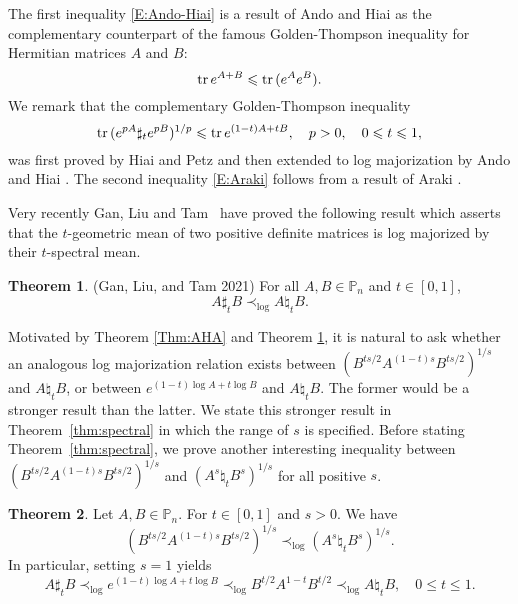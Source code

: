 \documentclass[12pt, reqno]{amsart}
\numberwithin{equation}{section}
\theoremstyle{definition}
\newtheorem{theorem}{Theorem}[section]
\renewcommand{\le}{\leqslant}
\def\P{\mathbb P}
\def\tr{{\rm tr\,}}
\begin{document}

The first inequality \eqref{E:Ando-Hiai} is a result of Ando and Hiai \cite[Corollary 2.3]{AH94} as the complementary counterpart of the famous Golden-Thompson inequality for Hermitian matrices $A$ and $B$: 
\[
\tr e^{A+B}\le \tr (e^Ae^B).
\] 
We remark that the complementary Golden-Thompson inequality 
\[
\tr (e^{pA}\sharp_{t}e^{pB})^{1/p} \le  \tr e^{(1-t) A + t  B},\quad p>0, \quad 0\le  t\le 1,
\]
was first proved by Hiai and Petz \cite {HP93} and then  extended to log majorization by Ando and Hiai \cite {AH94}.
The second inequality {\eqref{E:Araki}} follows from a result of Araki \cite{A90}.

Very recently Gan, Liu and Tam~\cite{GLT21}  have proved the following result which asserts that the $t$-geometric mean of two positive definite matrices is  log majorized by their $t$-spectral mean.

\begin{theorem} \label{Thm:spectral_geometric} \rm (Gan, Liu, and Tam 2021)
For all $A, B \in \P_n$ and $t \in [0, 1]$, 
\begin{equation}\label{spectral_geometric}
A \sharp_t B\prec_{\log} A \natural_t B.
\end{equation}
\end{theorem}

 
 


Motivated by Theorem \ref{Thm:AHA} and  Theorem \ref{Thm:spectral_geometric},
it is natural to ask whether an analogous log majorization relation exists between $\left(B^{ts/2}A^{(1-t)s}B^{ts/2} \right)^{1/s}$ and $A\natural_t B$, or between $e^{(1-t) \log A + t \log B}$ and $A\natural_t B$. The former would be a stronger result than the latter. We state this stronger result in Theorem~\ref{thm:spectral} in which the range of $s$ is specified. Before stating Theorem~\ref{thm:spectral}, we prove another interesting inequality between $\left(B^{ts/2}A^{(1-t)s}B^{ts/2} \right)^{1/s}$ and $(A^s\natural_t B^s)^{1/s}$ for all positive $s$.



\begin{theorem}\label{thm:spectral2}
Let $A, B \in \P_n$. For $t\in [0,1]$ and $s > 0$. We have
\begin{equation}\label{thm:natlog2}
\left(B^{ts/2}A^{(1-t)s}B^{ts/2} \right)^{1/s}\prec_{\log} (A^{s} \natural_t B^{s})^{1/s}.
\end{equation}
In particular, setting $s=1$ yields
\begin{equation}\label{chain}
A \sharp_t B\prec_{\log} e^{(1-t) \log A + t \log B}\prec_{\log} B^{t/2}A^{1-t} B^{t/2} \prec_{\log} A\natural_t B,\quad 0\le t\le 1.
\end{equation}
\end{theorem}
\end{document}
